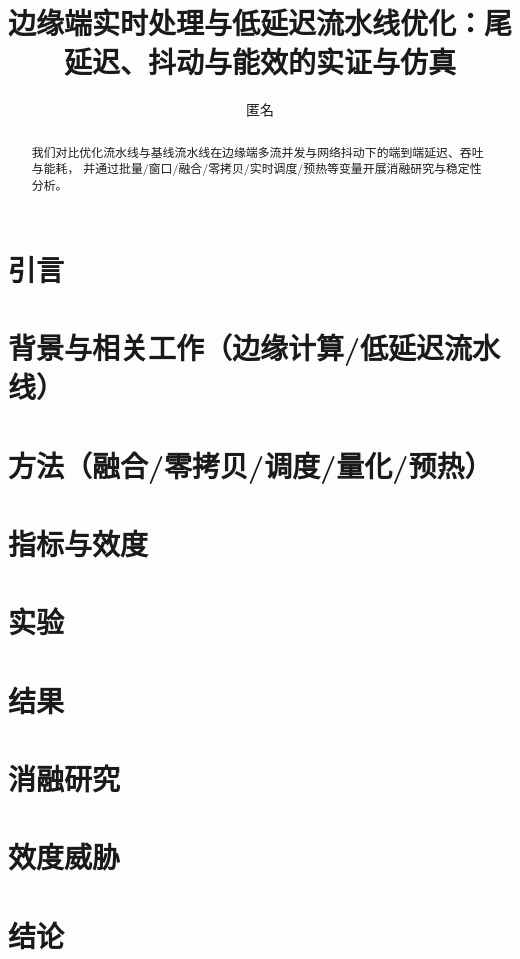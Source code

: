 \documentclass[UTF8]{ctexart}
\title{边缘端实时处理与低延迟流水线优化：尾延迟、抖动与能效的实证与仿真}
\author{匿名}
\date{}
\begin{document}
\maketitle

\begin{abstract}
我们对比优化流水线与基线流水线在边缘端多流并发与网络抖动下的端到端延迟、吞吐与能耗，
并通过批量/窗口/融合/零拷贝/实时调度/预热等变量开展消融研究与稳定性分析。
\end{abstract}

\section{引言}
\section{背景与相关工作（边缘计算/低延迟流水线）}
\section{方法（融合/零拷贝/调度/量化/预热）}
\section{指标与效度}
\section{实验}
\section{结果}
\section{消融研究}
\section{效度威胁}
\section{结论}



\end{document}
